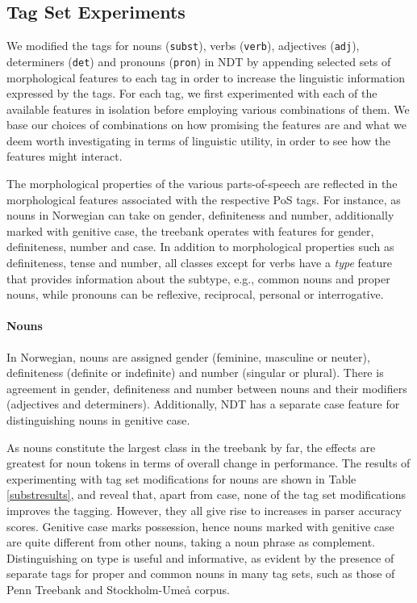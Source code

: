 \documentclass[11pt,a4paper]{article}
\begin{document}
\subsection{Tag Set Experiments}
We modified the tags for nouns (\texttt{subst}), verbs (\texttt{verb}),
adjectives (\texttt{adj}), determiners (\texttt{det}) and pronouns
(\texttt{pron}) in NDT by appending selected sets of morphological features to
each tag in order to increase the linguistic information expressed by the tags.
For each tag, we first experimented with each of the available features in
isolation before employing various combinations of them. We base our choices
of combinations on how promising the features are and what we deem worth
investigating in terms of linguistic utility, in order to see how the features
might interact.

The morphological properties of the various parts-of-speech are reflected in
the morphological features associated with the respective PoS tags. For
instance, as nouns in Norwegian can take on gender, definiteness and number,
additionally marked with genitive case, the treebank operates with features for
gender, definiteness, number and case.
In addition to morphological properties such as definiteness, tense and number,
all classes except for verbs have a \emph{type} feature that provides
information about the subtype, e.g., common nouns and proper nouns, while
pronouns can be reflexive, reciprocal, personal or interrogative.


\paragraph{Nouns}
In Norwegian, nouns are assigned gender (feminine, masculine or neuter),
definiteness (definite or indefinite) and number (singular or plural). There
is agreement in gender, definiteness and number between nouns and their
modifiers (adjectives and determiners). Additionally, NDT has a separate case
feature for distinguishing nouns in genitive case.

As nouns constitute the largest class in the treebank by far, the effects are
greatest for noun tokens in terms of overall change in performance. The results
of experimenting with tag set modifications for nouns are shown in Table
\ref{substresults}, and reveal that, apart from case, none of the tag set
modifications improves the tagging. However, they all give rise to increases in
parser accuracy scores. Genitive case marks possession, hence nouns marked with
genitive case are quite different from other nouns, taking a noun phrase as
complement. Distinguishing on type is useful and informative, as evident by the
presence of separate tags for proper and common nouns in many tag sets, such as
those of Penn Treebank and Stockholm-Umeå corpus.
\end{document}
